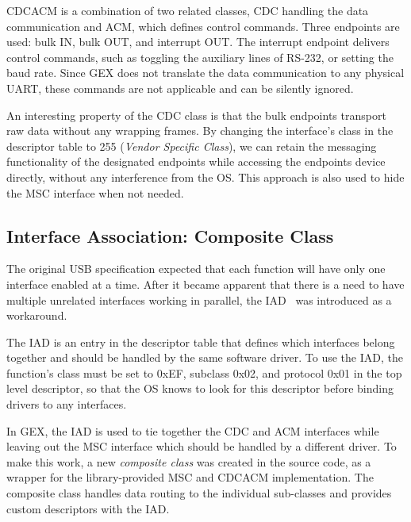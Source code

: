 \gls{CDCACM} is a combination of two related classes, \gls{CDC} handling the data communication and \gls{ACM}, which defines control commands. Three endpoints are used: bulk IN, bulk OUT, and interrupt OUT. The interrupt endpoint delivers control commands, such as toggling the auxiliary lines of RS-232, or setting the baud rate. Since GEX does not translate the data communication to any physical UART, these commands are not applicable and can be silently ignored.

An interesting property of the \gls{CDC} class is that the bulk endpoints transport raw data without any wrapping frames. By changing the interface's class in the descriptor table to 255 (\textit{Vendor Specific Class}), we can retain the messaging functionality of the designated endpoints while accessing the endpoints device directly, without any interference from the \gls{OS}. This approach is also used to hide the \gls{MSC} interface when not needed.

\subsection{Interface Association: Composite Class}

The original \gls{USB} specification expected that each function will have only one interface enabled at a time. After it became apparent that there is a need to have multiple unrelated interfaces working in parallel, the \gls{IAD}~\cite{usbif-iad} was introduced as a workaround.

The \gls{IAD} is an entry in the descriptor table that defines which interfaces belong together and should be handled by the same software driver. To use the \gls{IAD}, the function's class must be set to 0xEF, subclass 0x02, and protocol 0x01 in the top level descriptor, so that the \gls{OS} knows to look for this descriptor before binding drivers to any interfaces.

In GEX, the \gls{IAD} is used to tie together the \gls{CDC} and \gls{ACM} interfaces while leaving out the \gls{MSC} interface which should be handled by a different driver. To make this work, a new \textit{composite class} was created in the source code, as a wrapper for the library-provided \gls{MSC} and \gls{CDCACM} implementation. The composite class handles data routing to the individual sub-classes and provides custom descriptors with the \gls{IAD}.

